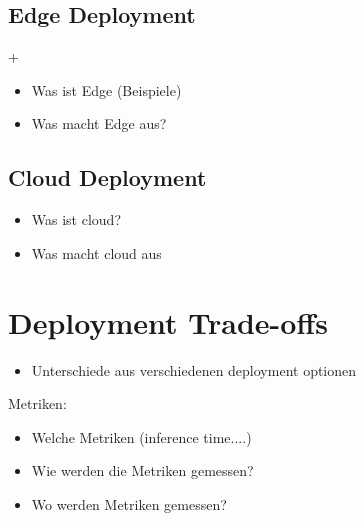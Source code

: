 \subsection{Edge Deployment}+
\begin{itemize}
    \item Was ist Edge (Beispiele)
    \item Was macht Edge aus?
\end{itemize}
\subsection{Cloud Deployment}
\begin{itemize}
    \item Was ist cloud?
    \item Was macht cloud aus
\end{itemize}
\section{Deployment Trade-offs}
\begin{itemize}
    \item Unterschiede aus verschiedenen deployment optionen
\end{itemize}
Metriken:
\begin{itemize}
    \item Welche Metriken (inference time....)
    \item Wie werden die Metriken gemessen?
    \item Wo werden Metriken gemessen?
\end{itemize}

\endinput 